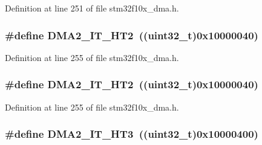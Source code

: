 Definition at line 251 of file stm32f10x\+\_\+dma.\+h.

\subsubsection[{\texorpdfstring{D\+M\+A2\+\_\+\+I\+T\+\_\+\+H\+T2}{DMA2_IT_HT2}}]{\setlength{\rightskip}{0pt plus 5cm}\#define D\+M\+A2\+\_\+\+I\+T\+\_\+\+H\+T2~(({\bf uint32\+\_\+t})0x10000040)}\hypertarget{group___d_m_a__interrupts__definition_gaf1cb017935477795a7bfb0d1a271e69a}{}\label{group___d_m_a__interrupts__definition_gaf1cb017935477795a7bfb0d1a271e69a}


Definition at line 255 of file stm32f10x\+\_\+dma.\+h.

\subsubsection[{\texorpdfstring{D\+M\+A2\+\_\+\+I\+T\+\_\+\+H\+T2}{DMA2_IT_HT2}}]{\setlength{\rightskip}{0pt plus 5cm}\#define D\+M\+A2\+\_\+\+I\+T\+\_\+\+H\+T2~(({\bf uint32\+\_\+t})0x10000040)}\hypertarget{group___d_m_a__interrupts__definition_gaf1cb017935477795a7bfb0d1a271e69a}{}\label{group___d_m_a__interrupts__definition_gaf1cb017935477795a7bfb0d1a271e69a}


Definition at line 255 of file stm32f10x\+\_\+dma.\+h.

\subsubsection[{\texorpdfstring{D\+M\+A2\+\_\+\+I\+T\+\_\+\+H\+T3}{DMA2_IT_HT3}}]{\setlength{\rightskip}{0pt plus 5cm}\#define D\+M\+A2\+\_\+\+I\+T\+\_\+\+H\+T3~(({\bf uint32\+\_\+t})0x10000400)}\hypertarget{group___d_m_a__interrupts__definition_gab3c0d024e03f9fdca539710c7e528904}{}\label{group___d_m_a__interrupts__definition_gab3c0d024e03f9fdca539710c7e528904}



